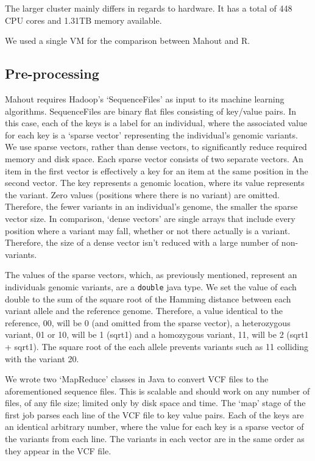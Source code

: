 \documentclass{bioinfo}
\begin{document}
\begin{methods}
The larger cluster mainly differs in regards to hardware. It has a total of 448 CPU cores and 1.31TB memory available. 

We used a single VM for the comparison between Mahout and R.

\subsection*{Pre-processing}
\label{Sec:preprocessing}
Mahout requires Hadoop's `SequenceFiles' as input to its machine learning algorithms. SequenceFiles are binary flat files consisting of key/value pairs. In this case, each of the keys is a
label for an individual, where the associated value for each key is a `sparse vector' representing the individual's genomic variants. We use sparse vectors, rather than
dense vectors, to significantly reduce required memory and disk space. Each sparse vector consists of two separate vectors. An item in the first vector is
effectively a key for an item at the same position in the second vector. The key represents a genomic location, where its value represents the variant. Zero values (positions where there is no variant)
are omitted. Therefore, the fewer variants in an individual's genome, the smaller the sparse vector size. In comparison, `dense vectors' are single arrays that
include every position where a variant may fall, whether or not there actually is a variant. Therefore, the size of a dense vector isn't reduced with a large number of non-variants.

The values of the sparse vectors, which, as previously mentioned, represent an individuals genomic variants, are a \texttt{double} java type.
We set the value of each double to the sum of the square root of the Hamming distance between each variant allele and the reference genome. Therefore, a value identical to the reference, 0\textbar{}0, will be 0 (and omitted from the sparse vector),
a heterozygous variant, 0\textbar{}1 or 1\textbar{}0, will be 1 (sqrt1) and a homozygous variant, 1\textbar{}1, will be 2 (sqrt1 + sqrt1). The square root of the each allele prevents variants such as 1\textbar{}1 colliding with the variant 2\textbar{}0.

We wrote two `MapReduce' classes in Java to convert VCF files to the aforementioned sequence files. This is scalable and should work on any number of files,
of any file size; limited only by disk space and time. 
The `map' stage of the first job parses each line of the VCF file to key value pairs. Each of the keys are an identical arbitrary number, where the value for each key is a sparse vector of the variants from each line. The variants in each vector are in the same order as they appear in the VCF file.


\end{methods}
\end{document}
